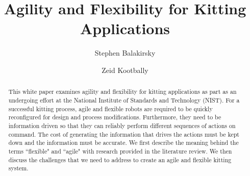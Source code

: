\documentclass[final,3p,12pt]{elsarticle}
\begin{document}
\begin{frontmatter}



\title{Agility and Flexibility for Kitting Applications}


\author[NIST]{Stephen Balakirsky}
\author[UMD]{Zeid Kootbally}

\address[NIST]{National Institute of Standards and Technology, Gaithersburg, MD USA}
\address[UMD]{University of Maryland, College Park, MD, USA}

 \begin{abstract}
This white paper examines agility and flexibility for kitting applications as part as an undergoing effort at the National Institute of Standards and Technology (NIST). For a successful kitting process, agile and flexible robots are required to be quickly reconfigured for design and process modifications. Furthermore, they need to be information driven so that they can reliably perform different sequences of actions on command. The cost of generating the information that drives the actions must be kept down and the information must be accurate. We first describe the meaning behind the terms ``flexible" and ``agile" with research provided in the literature review. We then discuss the challenges that we need to address to create an agile and flexible kitting system.

 \end{abstract}


\end{frontmatter}
\end{document}
